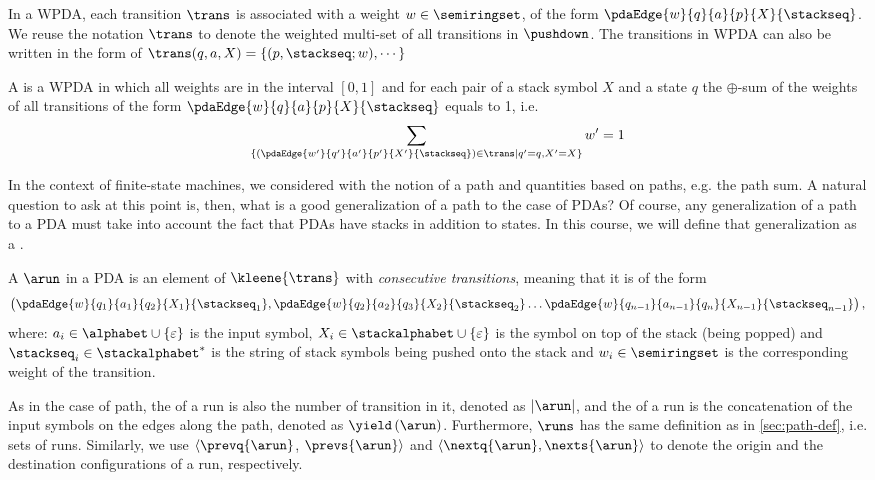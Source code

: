 In a WPDA, each transition $\trans$ is associated with a weight $w \in \semiringset$, of the  form $\pdaEdge{w}{q}{a}{p}{X}{\stackseq}$. We reuse the notation $\trans$ to denote the weighted multi-set of all transitions in $\pushdown$.
The transitions in WPDA can also be written in the form of $\trans(q, a, X) = \{(p, \stackseq; w), \cdots \}$ 


\begin{definition}
A  is a WPDA in which all weights are in the interval $[0,1]$ and for each pair of a stack symbol $X$ and a state $q$ the $\oplus$-sum of the weights of all transitions of the form $\pdaEdge{w}{q}{a}{p}{X}{\stackseq}$ equals to 1, i.e.
\begin{equation}
\sum_{\left\{ (\pdaEdge{w'}{q'}{a'}{p'}{X'}{\stackseq}) \in \trans \mid q'=q, X'=X \right\}} w' = 1
\end{equation}
\end{definition}


In the context of finite-state machines, we considered with the notion of a path and quantities based on paths, e.g. the path sum.
A natural question to ask at this point is, then, what is a good generalization of a path to the case of PDAs?
Of course, any generalization of a path to a PDA must take into account the fact that PDAs have stacks in addition to states.
In this course, we will define that generalization as a .

\begin{definition}
A  $\arun$ in a PDA is an element of $\kleene{\trans}$ with \emph{consecutive transitions}, meaning that it is of the form $$\left( \pdaEdge{w}{q_1}{a_1}{q_2}{X_1}{\stackseq_1}, \pdaEdge{w}{q_2}{a_2}{q_3}{X_2}{\stackseq_2} \ldots  \pdaEdge{w}{q_{n-1}}{a_{n-1}}{q_n}{X_{n-1}}{\stackseq_{n-1}} \right),$$ where:
$a_i \in \alphabet \cup \{\varepsilon\}$ is the input symbol, $X_i \in \stackalphabet \cup \{\varepsilon\}$ is the symbol on top of the stack (being popped) and $\stackseq_i \in \stackalphabet^*$ is the string of stack symbols being pushed onto the stack and $w_i \in \semiringset$ is the corresponding weight of the transition.
\end{definition}

As in the case of path, the  of a run is also the number of transition in it, denoted as $|\arun|$, and the  of a run is the concatenation of the input symbols on the edges along the path, denoted as $\yield\left(\arun\right)$. 
Furthermore, $\runs$ has the same definition as in \cref{sec:path-def}, i.e. sets of runs. 
Similarly, we use $\langle \prevq{\arun}$, $\prevs{\arun} \rangle$ and $\langle \nextq{ \arun }, \nexts{\arun} \rangle $ to denote the origin and the destination configurations of a run, respectively. 

